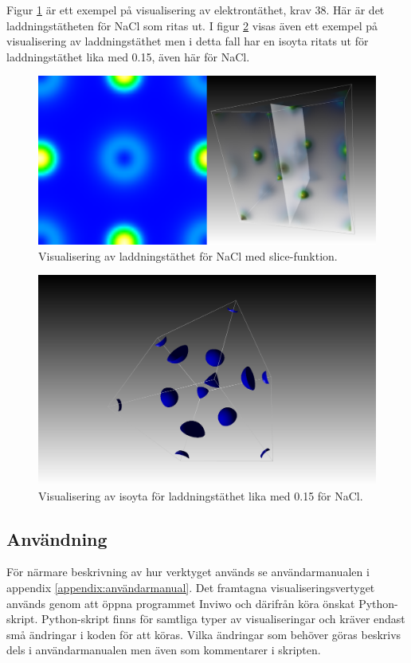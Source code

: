 \documentclass[a4paper,12pt]{article}
\begin{document}
Figur \ref{fig:visualisering_NaCl_slice} är ett exempel på visualisering av elektrontäthet, krav 38. Här är det laddningstätheten för NaCl som ritas ut. I figur  \ref{fig:visualisering_NaCl_iso} visas även ett exempel på visualisering av laddningstäthet men i detta fall har en isoyta ritats ut för laddningstäthet lika med 0.15, även här för NaCl.

\begin{figure}[H]
	\centering
	\includegraphics[scale=0.15]{NaCl_laddningstathet_slice_visualisering.png}
	\caption{Visualisering av laddningstäthet för NaCl med slice-funktion.}
	\label{fig:visualisering_NaCl_slice}
\end{figure}

\begin{figure}[H]
	\centering
	\includegraphics[scale=0.15]{NaCl_laddningstathet_iso_visualisering.png}
	\caption{Visualisering av isoyta för laddningstäthet lika med 0.15 för NaCl.}
	\label{fig:visualisering_NaCl_iso}
\end{figure}

\subsection{Användning}
För närmare beskrivning av hur verktyget används se användarmanualen i appendix \ref{appendix:användarmanual}. Det framtagna visualiseringsvertyget används genom att öppna programmet Inviwo och därifrån köra önskat Python-skript. Python-skript finns för samtliga typer av visualiseringar och kräver endast små ändringar i koden för att köras. Vilka ändringar som behöver göras beskrivs dels i användarmanualen men även som kommentarer i skripten. %
\end{document}
